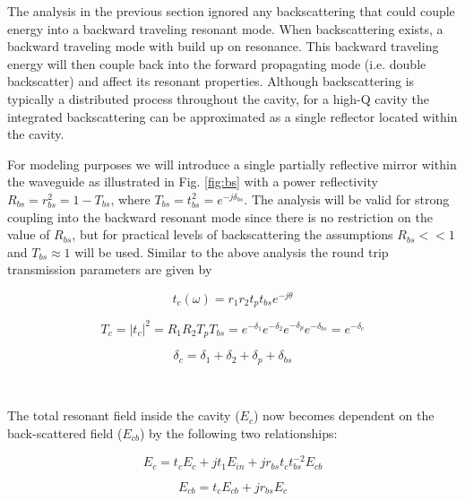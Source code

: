 \documentclass[10pt]{article}
\begin{document}
The analysis in the previous section ignored any backscattering that could couple energy into a backward traveling resonant mode.  When backscattering exists, a backward traveling mode with build up on resonance.  This backward traveling energy will then couple back into the forward propagating mode (i.e. double backscatter) and affect its resonant properties.  Although backscattering is typically a distributed process throughout the cavity, for a high-Q cavity the integrated backscattering can be approximated as a single reflector located within the cavity.

For modeling purposes we will introduce a single partially reflective mirror within the waveguide as illustrated in Fig. \ref{fig:bs} with a power reflectivity $R_{bs}  = r_{bs}^2 = 1-T_{bs}$, where $T_{bs} = t_{bs}^2 = e^{-j\delta_{bs}} $.   The analysis will be valid for strong coupling into the backward resonant mode since there is no restriction on the value of $R_{bs}$, but for practical levels of backscattering the assumptions $R_{bs} << 1$ and $T_{bs} \approx 1$ will be used.   Similar to the above analysis the round trip transmission parameters are given by
  
\begin{equation} t_{c}(\omega) = r_1 r_2 t_p t_{bs} e^{-j\theta} \end{equation} 

\begin{equation} 
T_c = |t_c|^2 = R_1 R_2 T_p T_{bs} = e^{-\delta_1} e^{-\delta_2} e^{-\delta_p} e^{-\delta_{bs}} = e^{-\delta_c}  \end{equation}


\begin{equation} 
\delta_c = \delta_1 + \delta_2 + \delta_p + \delta_{bs} \end{equation}  

~
\newline


The total resonant field inside the cavity ($E_c$) now becomes dependent on the back-scattered field ($E_{cb}$) by the following two relationships:

\begin{equation} 
E_c = t_c E_c + jt_1E_{in} + jr_{bs} t_c t_{bs}^{-2} E_{cb} 
\end{equation}  

\begin{equation} 
E_{cb} = t_c E_{cb} + j r_{bs} E_c 
\end{equation}  
\end{document}
